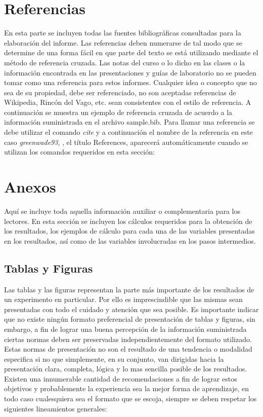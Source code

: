 \documentclass[a4paper]{article}
\begin{document}
\section{Referencias}
En esta parte se incluyen todas las fuentes bibliográficas consultadas para la elaboración del informe. Las referencias deben numerarse de tal modo que se determine de una forma fácil en que parte del texto se está utilizando mediante el método de referencia cruzada. Las notas del curso o lo dicho en las clases o la información encontrada en las presentaciones y guías de laboratorio no se pueden tomar como una referencia para estos informes.
Cualquier idea o concepto que no sea de su propiedad, debe ser referenciado, no son aceptadas referencias de Wikipedia, Rincón del Vago, etc. sean consistentes con el estilo de referencia. A continuación se muestra un ejemplo de referencia cruzada de acuerdo a la información suministrada en el archivo sample.bib. Para llamar una referencia se debe utilizar el comando \textit{cite} y a continuación el nombre de la referencia en este caso \textit{greenwade93}, \cite{greenwade93}, el título References, aparecerá automáticamente cuando se utilizan los comandos requeridos en esta sección: 

 


\section{Anexos}
Aquí se incluye toda aquella información auxiliar o complementaria para los lectores. En esta sección se incluyen los cálculos requeridos para la obtención de los resultados, los ejemplos de cálculo para cada una de las variables presentadas en los resultados, así como de las variables involucradas en los pasos intermedios.

\subsection{Tablas y Figuras}
Las tablas y las figuras representan la parte más importante de los resultados de un experimento en particular. Por ello es imprescindible que las mismas sean presentadas con todo el cuidado y atención que sea posible. Es importante indicar que no existe ningún formato preferencial de presentación de tablas y figuras, sin embargo, a fin de lograr una buena percepción de la información suministrada ciertas normas deben ser preservadas independientemente del formato utilizado. Estas normas de presentación no son el resultado de una tendencia o modalidad especifica si no que simplemente, en su conjunto, van dirigidas hacia la presentación clara, completa, lógica y lo mas sencilla posible de los resultados. Existen una innumerable cantidad de recomendaciones a fin de lograr estos objetivos y probablemente la experiencia sea la mejor forma de aprendizaje, en todo caso cualesquiera sea el formato que se escoja, siempre se deben respetar los siguientes lineamientos generales:
\end{document}
